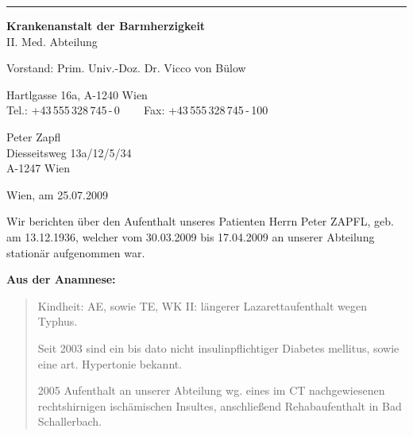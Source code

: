 {}

\hrule

\vspace{1em}

\begin{center}\sffamily
 \textbf{Krankenanstalt der Barmherzigkeit} 
 \\II. Med. Abteilung 
 
Vorstand: Prim. Univ.-Doz. Dr. Vicco von Bülow
 
{\scriptsize Hartlgasse 16a, A-1240 Wien
\\
Tel.: +43\,555\,328\,745\,-\,0 ~~~ Fax: +43\,555\,328\,745\,-\,100}
\end{center}

{%
\FontTtNarrowFamily

\vspace{1em}
                                                                                                                            


\noindent Peter Zapfl\\
Diesseitsweg 13a/12/5/34 \\
A-1247 Wien
\vspace{1.5em}

\begin{flushright}
Wien, am 25.07.2009
\end{flushright}

  Wir berichten über den Aufenthalt unseres Patienten Herrn Peter ZAPFL, geb.
  am 13.12.1936, welcher vom 30.03.2009 bis 17.04.2009 an unserer Abteilung
  stationär aufgenommen war.

{\bfseries   Aus der Anamnese:}

\begin{quote}
  Kindheit: AE, sowie TE, WK II: längerer Lazarettaufenthalt
  wegen Typhus.
  
  Seit 2003 sind ein bis dato nicht insulinpflichtiger
  Diabetes mellitus, sowie eine art. Hypertonie bekannt.
  
  2005 Aufenthalt an unserer Abteilung wg. eines im
  CT nachgewiesenen rechtshirnigen
  ischämischen Insultes, anschließend Rehabaufenthalt in Bad
  Schallerbach.
  

\end{quote}}
